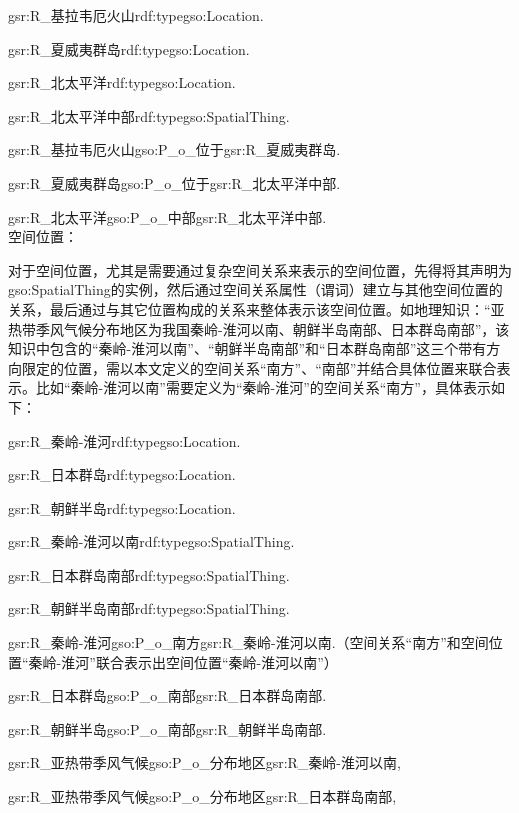 gsr:R\_基拉韦厄火山\quad rdf:type\quad  gso:Location\quad  .

gsr:R\_夏威夷群岛\quad rdf:type\quad  gso:Location\quad  .

gsr:R\_北太平洋\quad rdf:type\quad  gso:Location\quad  .

gsr:R\_北太平洋中部\quad rdf:type\quad  gso:SpatialThing\quad  .

gsr:R\_基拉韦厄火山\quad  gso:P\_o\_位于\quad  gsr:R\_夏威夷群岛\quad  .

gsr:R\_夏威夷群岛\quad  gso:P\_o\_位于\quad  gsr:R\_北太平洋中部\quad  .

gsr:R\_北太平洋\quad  gso:P\_o\_中部\quad  gsr:R\_北太平洋中部\quad  .
\\

空间位置：

对于空间位置，尤其是需要通过复杂空间关系来表示的空间位置，先得将其声明为gso:SpatialThing的实例，然后通过空间关系属性（谓词）建立与其他空间位置的关系，最后通过与其它位置构成的关系来整体表示该空间位置。如地理知识：“亚热带季风气候分布地区为我国秦岭-淮河以南、朝鲜半岛南部、日本群岛南部”，该知识中包含的“秦岭-淮河以南”、“朝鲜半岛南部”和“日本群岛南部”这三个带有方向限定的位置，需以本文定义的空间关系“南方”、“南部”并结合具体位置来联合表示。比如“秦岭-淮河以南”需要定义为“秦岭-淮河”的空间关系“南方”，具体表示如下：

gsr:R\_秦岭-淮河\quad rdf:type\quad gso:Location\quad .

gsr:R\_日本群岛\quad rdf:type\quad gso:Location\quad .

gsr:R\_朝鲜半岛\quad rdf:type\quad gso:Location\quad .

gsr:R\_秦岭-淮河以南\quad rdf:type\quad gso:SpatialThing\quad .

gsr:R\_日本群岛南部\quad rdf:type\quad gso:SpatialThing\quad .

gsr:R\_朝鲜半岛南部\quad rdf:type\quad gso:SpatialThing\quad .

gsr:R\_秦岭-淮河\quad gso:P\_o\_南方\quad gsr:R\_秦岭-淮河以南\quad .（空间关系“南方”和空间位置“秦岭-淮河”联合表示出空间位置“秦岭-淮河以南”）

gsr:R\_日本群岛\quad gso:P\_o\_南部\quad gsr:R\_日本群岛南部\quad .

gsr:R\_朝鲜半岛\quad gso:P\_o\_南部\quad gsr:R\_朝鲜半岛南部\quad .

gsr:R\_亚热带季风气候\quad gso:P\_o\_分布地区\quad gsr:R\_秦岭-淮河以南\quad ,\quad 

gsr:R\_亚热带季风气候\quad gso:P\_o\_分布地区\quad gsr:R\_日本群岛南部\quad ,\quad 

